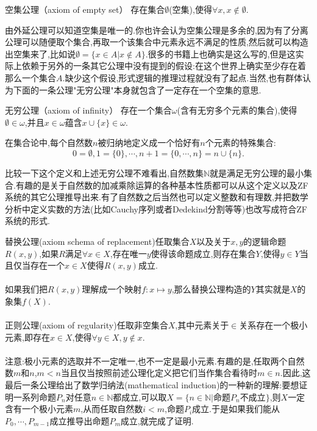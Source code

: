 空集公理（axiom of empty set） 存在集合$\emptyset$(空集),使得$\forall x,x\notin \emptyset$.

由外延公理可以知道空集是唯一的.你也许会认为空集公理是多余的,因为有了分离公理可以随便取个集合,再取一个该集合中元素永远不满足的性质,然后就可以构造出空集来了,比如说$\emptyset=\{x\in A|x\notin A\}$.很多的书籍上也确实是这么写的,但是这实际上依赖于另外的一条其它公理中没有提到的假设:在这个世界上确实至少存在着那么一个集合$A$.缺少这个假设,形式逻辑的推理过程就没有了起点.当然,也有群体认为下面的一条公理"无穷公理"本身就包含了一定存在一个空集的意思.

无穷公理（axiom of infinity） 存在一个集合$\omega$(含有无穷多个元素的集合),使得$\emptyset\in\omega$,并且$x\in\omega$蕴含$x\cup\{x\}\in\omega$.

在集合论中,每个自然数$n$被归纳地定义成一个恰好有$n$个元素的特殊集合:
\begin{equation}
0=\emptyset,1=\{0\},\cdots,n+1=\{0,\cdots,n\} = n\cup\{n\}.
\end{equation}	

比较一下这个定义和上述无穷公理不难看出,自然数集$\mathbb{N}$就是满足无穷公理的最小集合.有趣的是关于自然数的加减乘除运算的各种基本性质都可以从这个定义以及ZF系统的其它公理推导出来.有了自然数之后当然也可以定义整数和有理数,并把数学分析中定义实数的方法(比如Cauchy序列或者Dedekind分割等等)也改写成符合ZF系统的形式.

替换公理(axiom schema of replacement)任取集合$X$以及关于$x,y$的逻辑命题$R(x,y)$,如果$R$满足$\forall x\in X$,存在唯一$y$使得该命题成立,则存在集合$Y$,使得$y\in Y$当且仅当存在一个$x\in X$使得$R(x,y)$成立.
\\ \hspace*{\fill} \\%
如果我们把$R(x,y)$理解成一个映射$f:x\mapsto y$,那么替换公理构造的$Y$其实就是$X$的象集$f(X)$.
\\ \hspace*{\fill} \\%
正则公理(axiom of regularity)任取非空集合$X$,其中元素关于$\in$关系存在一个极小元素,即存在$x\in X$,使得$\forall y\in X,y\notin x$.
\\ \hspace*{\fill} \\%
注意:极小元素的选取并不一定唯一,也不一定是最小元素.有趣的是,任取两个自然数$m$和$n$,$m<n$当且仅当按照前述公理化定义把它们当作集合看待时$m\in n$.因此,这最后一条公理给出了数学归纳法(mathematical induction)的一种新的理解:要想证明一系列命题$P_n$对任意$n\in\mathbb{N}$都成立,可以取$X=\{ n\in\mathbb{N}|\text{命题}P_n\text{不成立} \}$,则$X$一定含有一个极小元素$m$,从而任取自然数$i<m$,命题$P_i$成立.于是如果我们能从$P_0,\cdots,P_{m-1}$成立推导出命题$P_m$成立,就完成了证明.

